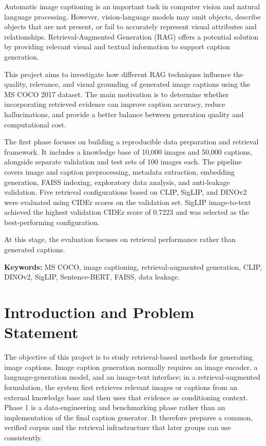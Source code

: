 \documentclass{article}
\begin{document}


Automatic image captioning is an important task in computer vision and natural language processing. However, vision-language models may omit objects, describe objects that are not present, or fail to accurately represent visual attributes and relationships. Retrieval-Augmented Generation (RAG) offers a potential solution by providing relevant visual and textual information to support caption generation.

This project aims to investigate how different RAG techniques influence the quality, relevance, and visual grounding of generated image captions using the MS COCO 2017 dataset. The main motivation is to determine whether incorporating retrieved evidence can improve caption accuracy, reduce hallucinations, and provide a better balance between generation quality and computational cost.

The first phase focuses on building a reproducible data preparation and retrieval framework. It includes a knowledge base of 10,000 images and 50,000 captions, alongside separate validation and test sets of 100 images each. The pipeline covers image and caption preprocessing, metadata extraction, embedding generation, FAISS indexing, exploratory data analysis, and anti-leakage validation. Five retrieval configurations based on CLIP, SigLIP, and DINOv2 were evaluated using CIDEr scores on the validation set. SigLIP image-to-text achieved the highest validation CIDEr score of 0.7223 and was selected as the best-performing configuration.

At this stage, the evaluation focuses on retrieval performance rather than generated captions.

\textbf{Keywords:} MS COCO, image captioning, retrieval-augmented
generation, CLIP, DINOv2, SigLIP, Sentence-BERT, FAISS, data leakage.



\newpage

\setcounter{section}{0}
\section{Introduction and Problem
Statement}\label{introduction-and-problem-statement}

The objective of this project is to study retrieval-based methods for
generating image captions. Image caption generation normally requires an
image encoder, a language-generation model, and an image-text interface;
in a retrieval-augmented formulation, the system first retrieves
relevant images or captions from an external knowledge base and then
uses that evidence as conditioning context. Phase 1 is a
data-engineering and benchmarking phase rather than an implementation of
the final caption generator. It therefore prepares a common, verified
corpus and the retrieval infrastructure that later groups can use
consistently.
\end{document}
